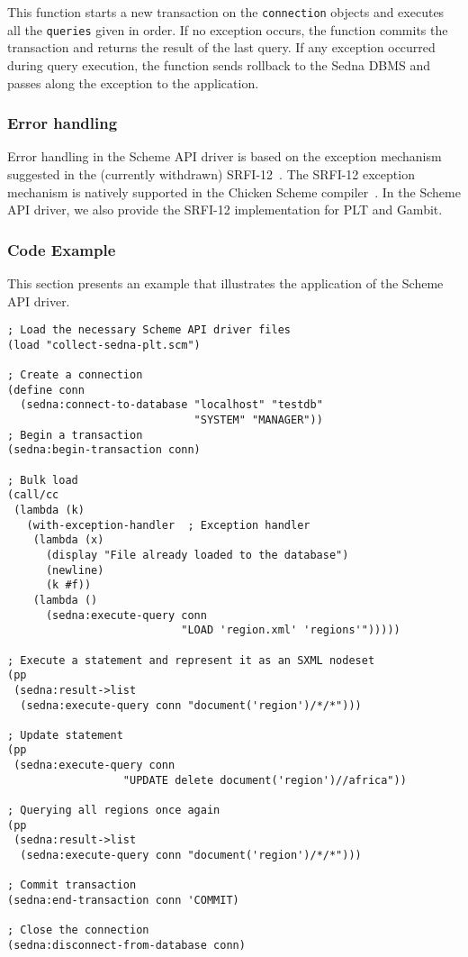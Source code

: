 \documentclass[a4paper,12pt]{article}
\begin{document}
This function starts a new transaction on the \texttt{connection} objects and
executes all the \texttt{queries} given in order. If no exception occurs, the
function commits the transaction and returns the result of the last query. If
any exception occurred during query execution, the function sends rollback to
the Sedna DBMS and passes along the exception to the application.


\subsubsection{Error handling}
\label{scheme-errors}

Error handling in the Scheme API driver is based on the exception mechanism
suggested in the (currently withdrawn) SRFI-12~\cite{paper:srfi-12}. The SRFI-12
exception mechanism is natively supported in the Chicken Scheme
compiler~\cite{paper:chicken}. In the Scheme API driver, we also provide the
SRFI-12 implementation for PLT and Gambit.

\subsubsection{Code Example}

This section presents an example that illustrates the application of the Scheme
API driver.

\small{
\begin{verbatim}
; Load the necessary Scheme API driver files
(load "collect-sedna-plt.scm")

; Create a connection
(define conn
  (sedna:connect-to-database "localhost" "testdb"
                             "SYSTEM" "MANAGER"))
; Begin a transaction
(sedna:begin-transaction conn)

; Bulk load
(call/cc
 (lambda (k)
   (with-exception-handler  ; Exception handler
    (lambda (x)
      (display "File already loaded to the database")
      (newline)
      (k #f))
    (lambda ()
      (sedna:execute-query conn 
                           "LOAD 'region.xml' 'regions'")))))

; Execute a statement and represent it as an SXML nodeset
(pp
 (sedna:result->list
  (sedna:execute-query conn "document('region')/*/*")))

; Update statement
(pp
 (sedna:execute-query conn 
                  "UPDATE delete document('region')//africa"))

; Querying all regions once again
(pp
 (sedna:result->list
  (sedna:execute-query conn "document('region')/*/*")))

; Commit transaction
(sedna:end-transaction conn 'COMMIT)

; Close the connection
(sedna:disconnect-from-database conn)
\end{verbatim}}
\end{document}
